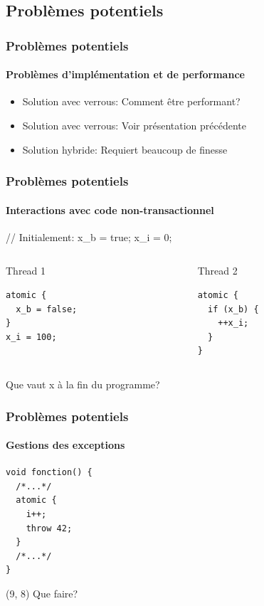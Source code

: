 \documentclass{beamer}
\begin{document}
\subsection{Problèmes potentiels}
\begin{frame}
\frametitle{Problèmes potentiels}
\framesubtitle{Problèmes d'implémentation et de performance}
\begin{itemize}
\item Solution avec verrous: Comment être performant?
\item Solution avec verrous: Voir présentation précédente
\item Solution hybride: Requiert beaucoup de finesse
\end{itemize}
\end{frame}

\begin{frame}[fragile]
\frametitle{Problèmes potentiels}
\framesubtitle{Interactions avec code non-transactionnel}
\begin{center}
// Initialement: x\_b = true; x\_i = 0;
\end{center}
\begin{columns}
    \begin{column}{0.5\textwidth}
    Thread 1
        \begin{lstlisting}        
atomic {
  x_b = false;
}
x_i = 100;
        \end{lstlisting}
    \end{column}
    \begin{column}{0.5\textwidth}
    Thread 2
        \begin{lstlisting}        
atomic {
  if (x_b) {
    ++x_i;
  }
}
        \end{lstlisting}
    \end{column}
\end{columns}
\begin{center}
Que vaut x à la fin du programme?
\end{center}
\end{frame}

\begin{frame}[fragile]
\frametitle{Problèmes potentiels}
\framesubtitle{Gestions des exceptions}
\begin{lstlisting}
void fonction() {
  /*...*/
  atomic {
    i++;
    throw 42;
  }
  /*...*/
}
\end{lstlisting}

\begin{textblock}{5}(9, 8)
	 \huge{Que faire?}
\end{textblock}
\end{frame}
\end{document}
